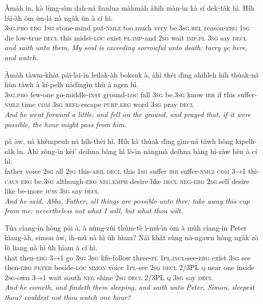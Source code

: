 \documentclass[11pt,a4paper]{article}
\begin{document}
\begin{exe}
\gll Àmàh ìn, kà lùng-sìm dah-ná lianlua màhmàh àhìh màn-ìn kà sí dek-tàk hì. Híh lái-àh ōm ùn-lá nà ngàk ùn à cí hì. \\
     \textsc{3sg}.\textsc{pro} \textsc{erg} \textsc{1sg} stone-mind put-\textsc{nmlz} too.much very be.\textsc{3sg}.\textsc{rel} reason-\textsc{erg} \textsc{1sg} die low-true \textsc{decl} this midst-\textsc{loc} exist \textsc{pl}.\textsc{imp}-and \textsc{2sg} wait \textsc{imp}.\textsc{pl} \textsc{3sg} say \textsc{decl} \\
\glt \textcolor{kjvcolor}{\textit{and saith unto them, My soul is exceeding sorrowful unto death: tarry ye here, and watch.}}

\gll Àmàh tàwm-khàt pái-lai-ìn leilak-àh boksuk à, àhì théi dìng ahihleh híh thùak-ná hùn tàwh à kī-pelh nàdìngìn thù à ngen hì. \\
     \textsc{3sg}.\textsc{pro} few-one go-middle-\textsc{inst} ground-\textsc{loc} fall \textsc{3sg} be.\textsc{3sg} know \textsc{irr} if this suffer-\textsc{nmlz} time \textsc{com} \textsc{3sg} \textsc{refl}-escape \textsc{purp}.\textsc{erg} word \textsc{3sg} pray \textsc{decl} \\
\glt \textcolor{kjvcolor}{\textit{And he went forward a little, and fell on the ground, and prayed that, if it were possible, the hour might pass from him.}}

\gll pà àw, nà khèmpeuh nà híh-thèi hì. Híh kà thùak dìng gìm-ná tàwh hòng kipelh-sàk ìn. Àhì zòng-ìn kèi' deihna bàng hì lò-ìn nàngmà deihna bàng hí-zàw hèn à cí hì. \\
     father voice \textsc{2sg} all \textsc{2sg} this-\textsc{abil} \textsc{decl} this \textsc{1sg} suffer \textsc{irr} suffer-\textsc{nmlz} \textsc{com} \textsc{3→1} thi-\textsc{caus} \textsc{erg} be.\textsc{3sg} although-\textsc{erg} \textsc{neg}.\textsc{emph} desire like \textsc{decl} \textsc{neg}-\textsc{erg} \textsc{2sg}.self desire like be-more \textsc{juss} \textsc{3sg} say \textsc{decl} \\
\glt \textcolor{kjvcolor}{\textit{And he said, Abba, Father, all things are possible unto thee; take away this cup from me: nevertheless not what I will, but what thou wilt.}}

\gll Túa cìang-ìn hòng pái à, à nùng-zúi thùm-tè ì-mú-ìn ōm à mùh cìang-ìn Peter kìang-àh, simon àw, ìh-mú nà hì ùh hìam? Nái khàt sùng nà-ngawn hòng ngàk zò lò liang nà hì ùh hìam à cí hì. \\
     that then-\textsc{erg} \textsc{3→1} go \textsc{3sg} \textsc{3sg} life-follow three-\textsc{pl} \textsc{1pl}.\textsc{incl}-see-\textsc{erg} exist \textsc{3sg} see then-\textsc{erg} \textsc{peter} beside-\textsc{loc} \textsc{simon} voice \textsc{1pl}-see \textsc{2sg} \textsc{decl} 2/3PL \textsc{q} near one inside \textsc{2sg}-own \textsc{3→1} wait south \textsc{neg} shine \textsc{2sg} \textsc{decl} 2/3PL \textsc{q} \textsc{3sg} say \textsc{decl} \\
\glt \textcolor{kjvcolor}{\textit{And he cometh, and findeth them sleeping, and saith unto Peter, Simon, sleepest thou? couldest not thou watch one hour?}}


\end{exe}
\end{document}
